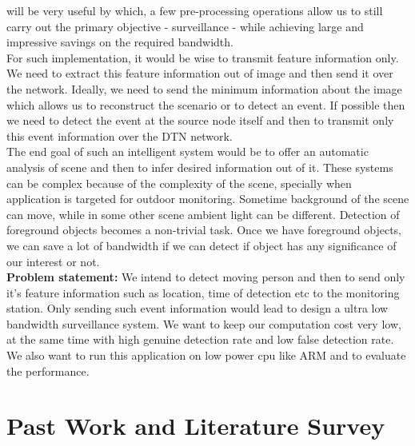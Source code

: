 will be very useful by which, a few pre-processing operations allow us to
still carry out the primary objective - surveillance - while achieving
large and impressive savings on the required bandwidth.\\
\indent  For such implementation, it would be wise to transmit feature
information only. We need to extract this feature information out of
image and then send it over the network.  Ideally, we need to send the
minimum information about the image which allows us to reconstruct the
scenario or to detect an event. If possible then we need to detect the
event at the source node itself and then to transmit only this event
information over the DTN network.\\
\indent The end goal of such an intelligent system would be to offer an
automatic analysis of scene and then to infer desired information out of
it. These systems can be complex because of the complexity of the scene,
specially when application is targeted for outdoor monitoring.  Sometime
background of the scene can move, while in some other scene ambient
light can be different. Detection of foreground objects becomes a
non-trivial task.  Once we have foreground objects, we can save a lot of
bandwidth if we can detect if object has any significance of our
interest or not.\\
\indent \textbf{Problem statement:} We intend to detect moving person
and then to send only it's feature information such as location, time of
detection etc to the monitoring station. Only sending such event
information would lead to design a ultra low bandwidth surveillance
system.  We want to keep our computation cost very low, at the same time
with high genuine detection rate and low false detection rate. We also
want to run this application on low power cpu like ARM and to evaluate
the performance.
\section{Past Work and Literature Survey}
